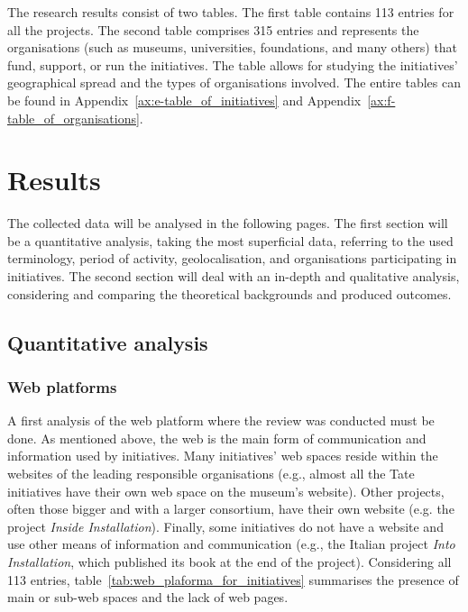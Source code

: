 The research results consist of two tables. The first table contains 113 entries for all the projects. The second table comprises 315 entries and represents the organisations (such as museums, universities, foundations, and many others) that fund, support, or run the initiatives. The table allows for studying the initiatives' geographical spread and the types of organisations involved. The entire tables can be found in Appendix~\ref{ax:e-table_of_initiatives} and Appendix~\ref{ax:f-table_of_organisations}.


\section{Results}
The collected data will be analysed in the following pages. The first section will be a quantitative analysis, taking the most superficial data, referring to the used terminology, period of activity, geolocalisation, and organisations participating in initiatives. The second section will deal with an in-depth and qualitative analysis, considering and comparing the theoretical backgrounds and produced outcomes. 


\subsection{Quantitative analysis}

\subsubsection{Web platforms}
A first analysis of the web platform where the review was conducted must be done. As mentioned above, the web is the main form of communication and information used by initiatives. Many initiatives’ web spaces reside within the websites of the leading responsible organisations (e.g., almost all the Tate initiatives have their own web space on the museum's website). Other projects, often those bigger and with a larger consortium, have their own website (e.g. the project \textit{Inside Installation}). Finally, some initiatives do not have a website and use other means of information and communication (e.g., the Italian project \textit{Into Installation}, which published its book at the end of the project). Considering all 113 entries, table~\ref{tab:web_plaforma_for_initiatives} summarises the presence of main or sub-web spaces and the lack of web pages.


